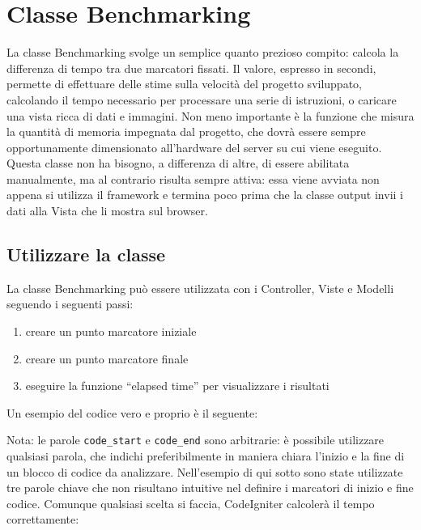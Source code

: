 \section{Classe Benchmarking}
\label{class:benchmark}

La classe Benchmarking svolge un semplice quanto prezioso compito: calcola la differenza di tempo tra due marcatori fissati. Il valore, espresso in secondi, permette di effettuare delle stime sulla velocità del progetto sviluppato, calcolando il tempo necessario per processare una serie di istruzioni, o caricare una vista ricca di dati e immagini. Non meno importante è la funzione che misura la quantità di memoria impegnata dal progetto, che dovrà essere sempre opportunamente dimensionato all'hardware del server su cui viene eseguito. Questa classe non ha bisogno, a differenza di altre, di essere abilitata manualmente, ma al contrario risulta sempre attiva: essa viene avviata non appena si utilizza il framework e termina poco prima che la classe output invii i dati alla Vista che li mostra sul browser.

\subsection*{Utilizzare la classe}
La classe Benchmarking può essere utilizzata con i Controller, Viste e Modelli seguendo i seguenti passi:

\begin{enumerate}
\item creare un punto marcatore iniziale
\item creare un punto marcatore finale
\item eseguire la funzione ``elapsed time'' per visualizzare i risultati
\end{enumerate}

Un esempio del codice vero e proprio è il seguente:


Nota: le parole \verb|code_start| e \verb|code_end| sono arbitrarie: è possibile utilizzare qualsiasi parola, che indichi preferibilmente in maniera chiara l'inizio e la fine di un blocco di codice da analizzare. Nell'esempio di qui sotto sono state utilizzate tre parole chiave che non risultano intuitive nel definire i marcatori di inizio e fine codice. Comunque qualsiasi scelta si faccia, CodeIgniter calcolerà il tempo correttamente:

